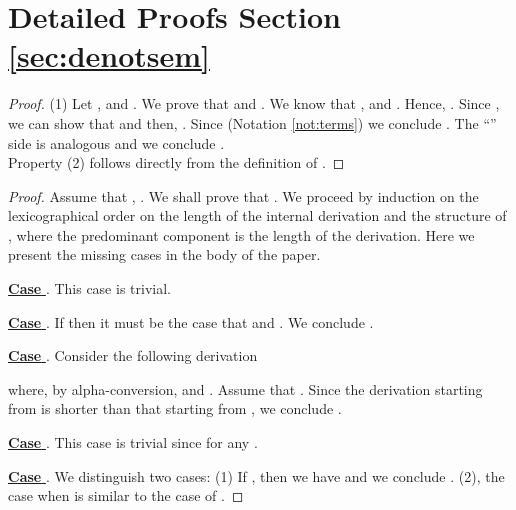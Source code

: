\documentclass{tlp}
\begin{document}
\section{Detailed Proofs Section \ref{sec:denotsem}} \label{app:proofs-den}
\begin{proof}
(1) Let ,   and . We  prove that  and .  We know that  
,  and . Hence, . Since , we can  show that 
 and then, .
Since  (Notation \ref{not:terms})  we conclude . The  ``'' side is analogous and we conclude . \\
Property (2) follows directly from the definition of . 
\end{proof}



\begin{proof}
Assume that ,  .
 We shall prove that . 
	We proceed by induction on the lexicographical order on the length of the internal derivation   and the structure of  , where the predominant component is the length of the derivation. Here we present the missing cases in the body of the paper. 

\noindent \underline{{\bf Case} }. This case is trivial. 

\noindent \underline{{\bf Case}  }. If  then it must be the case that  and  . We conclude  . 
	

\noindent \underline{{\bf Case}  }.  Consider the following derivation 
 
 where, by alpha-conversion,   and . Assume that 
   . 
 Since the derivation starting from  is shorter than that starting from , we conclude
.
 


\noindent \underline{{\bf Case}  }. This case is trivial since
	 for any . 
	
\noindent \underline{{\bf Case }}. We distinguish two cases:
(1) If , then we have  and  we conclude . (2), the case when       is similar to the case of . 

 








\end{proof}
\end{document}
